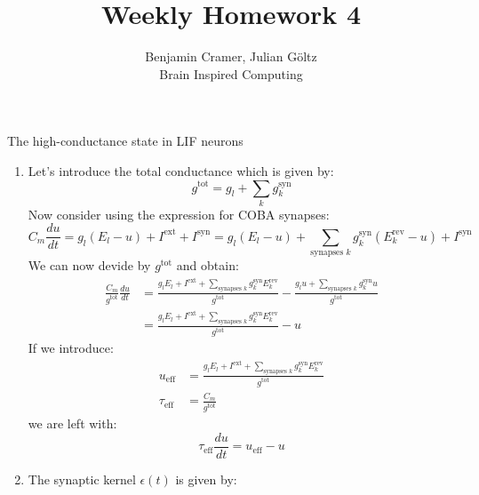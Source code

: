 \documentclass[12pt]{article}
\newenvironment{exercise}[2][Exercise]{\begin{trivlist}
\item[\hskip \labelsep {\bfseries #1}\hskip \labelsep {\bfseries #2.}]}{\end{trivlist}}
\begin{document}
 
 
\title{Weekly Homework 4}
\author{Benjamin Cramer, Julian G\"oltz\\
Brain Inspired Computing}
 
\maketitle
 
\begin{exercise}{4.1}
The high-conductance state in LIF neurons \\
\renewcommand{\labelenumi}{\alph{enumi})}
\begin{enumerate}
\item Let's introduce the total conductance which is given by:
  \begin{equation}
    g^{\text{tot}} = g_l + \sum_k g_k^{\text{syn}}
  \end{equation}
  Now consider using the expression for COBA synapses:
  \begin{equation}
    C_m \frac{du}{dt} = g_l (E_l - u) + I^{\text{ext}} + I^{\text{syn}} = g_l (E_l - u) + \sum_{\text{synapses }k}g_k^{\text{syn}}(E_k^{\text{rev}}-u) + I^{\text{syn}}
  \end{equation}
  We can now devide by $g^{\text{tot}}$ and obtain:
  \begin{align}
    \frac{C_m}{g^{\text{tot}}} \frac{du}{dt} &= \frac{g_lE_l + I^{\text{ext}} + \sum_{\text{synapses }k}g_k^{\text{syn}}E_k^{\text{rev}}}{g^{\text{tot}}} - \frac{g_lu + \sum_{\text{synapses }k}g_k^{\text{syn}}u}{g^{\text{tot}}} \\
                                             &= \frac{g_lE_l + I^{\text{ext}} + \sum_{\text{synapses }k}g_k^{\text{syn}}E_k^{\text{rev}}}{g^{\text{tot}}} - u
  \end{align}
  If we introduce:
  \begin{align}
    u_{\text{eff}} &= \frac{g_lE_l + I^{\text{ext}} + \sum_{\text{synapses }k}g_k^{\text{syn}}E_k^{\text{rev}}}{g^{\text{tot}}}\\
    \tau_{\text{eff}} &= \frac{C_m}{g^{\text{tot}}}
  \end{align}
  we are left with:
  \begin{equation}
    \tau_{\text{eff}} \frac{du}{dt} = u_{\text{eff}} - u
  \end{equation}
  \item The synaptic kernel $\epsilon(t)$ is given by:

\end{enumerate}
\end{exercise}
\end{document}

